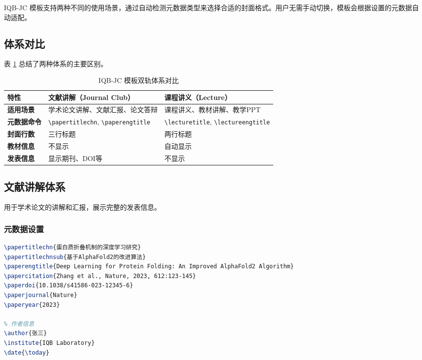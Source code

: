 IQB-JC 模板支持两种不同的使用场景，通过自动检测元数据类型来选择合适的封面格式。用户无需手动切换，模板会根据设置的元数据自动适配。

\subsection{体系对比}

表 \ref{tab:dual-system} 总结了两种体系的主要区别。

\begin{table}[!h]
\centering
\caption{IQB-JC 模板双轨体系对比}
\label{tab:dual-system}
\begin{tabular}{p{3cm}p{5cm}p{5cm}}
\toprule
\textbf{特性} & \textbf{文献讲解（Journal Club）} & \textbf{课程讲义（Lecture）} \\
\midrule
\textbf{适用场景} & 学术论文讲解、文献汇报、论文答辩 & 课程讲义、教材讲解、教学PPT \\
\textbf{元数据命令} & \lstinline|\papertitlechn|, \lstinline|\paperengtitle| & \lstinline|\lecturetitle|, \lstinline|\lectureengtitle| \\
\textbf{封面行数} & 三行标题 & 两行标题 \\
\textbf{教材信息} & 不显示 & 自动显示 \\
\textbf{发表信息} & 显示期刊、DOI等 & 不显示 \\
\bottomrule
\end{tabular}
\end{table}

\subsection{文献讲解体系}

用于学术论文的讲解和汇报，展示完整的发表信息。

\subsubsection{元数据设置}

\begin{lstlisting}[style=blockstyle,language=TeX]
% 文献元数据
\papertitlechn{蛋白质折叠机制的深度学习研究}
\papertitlechnsub{基于AlphaFold2的改进算法}
\paperengtitle{Deep Learning for Protein Folding: An Improved AlphaFold2 Algorithm}
\papercitation{Zhang et al., Nature, 2023, 612:123-145}
\paperdoi{10.1038/s41586-023-12345-6}
\paperjournal{Nature}
\paperyear{2023}

% 作者信息
\author{张三}
\institute{IQB Laboratory}
\date{\today}
\end{lstlisting}


